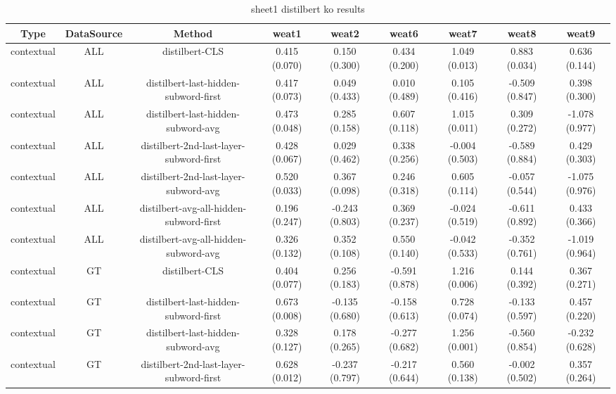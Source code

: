 \begin{sidewaystable}[htb]
    \centering
    \caption{sheet1 distilbert ko results}
    \label{appendix_tab:sheet1_distilbert_ko_results}
    \small
    \begin{tabular}{@{}ccccccccc@{}}
        \toprule
        Type & DataSource & Method & weat1 & weat2 & weat6 & weat7 & weat8 & weat9 \\
        \midrule
        contextual & ALL & distilbert-CLS & 0.415 (0.070) & 0.150 (0.300) & 0.434 (0.200) & 1.049 (0.013) & 0.883 (0.034) & 0.636 (0.144) \\
        contextual & ALL & distilbert-last-hidden-subword-first & 0.417 (0.073) & 0.049 (0.433) & 0.010 (0.489) & 0.105 (0.416) & -0.509 (0.847) & 0.398 (0.300) \\
        contextual & ALL & distilbert-last-hidden-subword-avg & 0.473 (0.048) & 0.285 (0.158) & 0.607 (0.118) & 1.015 (0.011) & 0.309 (0.272) & -1.078 (0.977) \\
        contextual & ALL & distilbert-2nd-last-layer-subword-first & 0.428 (0.067) & 0.029 (0.462) & 0.338 (0.256) & -0.004 (0.503) & -0.589 (0.884) & 0.429 (0.303) \\
        contextual & ALL & distilbert-2nd-last-layer-subword-avg & 0.520 (0.033) & 0.367 (0.098) & 0.246 (0.318) & 0.605 (0.114) & -0.057 (0.544) & -1.075 (0.976) \\
        contextual & ALL & distilbert-avg-all-hidden-subword-first & 0.196 (0.247) & -0.243 (0.803) & 0.369 (0.237) & -0.024 (0.519) & -0.611 (0.892) & 0.433 (0.366) \\
        contextual & ALL & distilbert-avg-all-hidden-subword-avg & 0.326 (0.132) & 0.352 (0.108) & 0.550 (0.140) & -0.042 (0.533) & -0.352 (0.761) & -1.019 (0.964) \\
        contextual & GT & distilbert-CLS & 0.404 (0.077) & 0.256 (0.183) & -0.591 (0.878) & 1.216 (0.006) & 0.144 (0.392) & 0.367 (0.271) \\
        contextual & GT & distilbert-last-hidden-subword-first & 0.673 (0.008) & -0.135 (0.680) & -0.158 (0.613) & 0.728 (0.074) & -0.133 (0.597) & 0.457 (0.220) \\
        contextual & GT & distilbert-last-hidden-subword-avg & 0.328 (0.127) & 0.178 (0.265) & -0.277 (0.682) & 1.256 (0.001) & -0.560 (0.854) & -0.232 (0.628) \\
        contextual & GT & distilbert-2nd-last-layer-subword-first & 0.628 (0.012) & -0.237 (0.797) & -0.217 (0.644) & 0.560 (0.138) & -0.002 (0.502) & 0.357 (0.264) \\

\end{tabular}
\end{sidewaystable}
